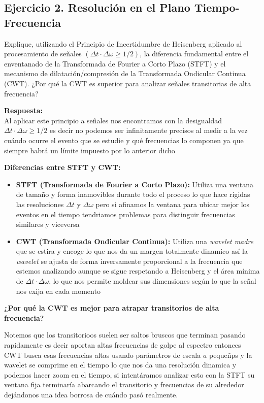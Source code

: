 \subsection*{Ejercicio 2. Resolución en el Plano Tiempo-Frecuencia} %
\noindent Explique, utilizando el Principio de Incertidumbre de Heisenberg aplicado al procesamiento de señales $(\Delta t\cdot\Delta\omega\ge1/2)$, la diferencia fundamental entre el enventanado de la Transformada de Fourier a Corto Plazo (STFT) y el mecanismo de dilatación/compresión de la Transformada Ondicular Continua (CWT). %
¿Por qué la CWT es superior para analizar señales transitorias de alta frecuencia? %

\vspace{0.5cm}
\noindent \textbf{Respuesta:} \\
Al aplicar este principio a señales nos encontramos con la desigualdad $\Delta t \cdot \Delta \omega \ge 1/2$ es decir no podemos ser infinitamente precisos al medir a la vez cuándo ocurre el evento que se estudie y qué frecuencias lo componen ya que siempre habrá un límite impuesto por lo anterior dicho

\textbf{Diferencias entre STFT y CWT:}
\begin{itemize}
    \item \textbf{STFT (Transformada de Fourier a Corto Plazo):} Utiliza una ventana de tamaño y forma inamovibles durante todo el proceso lo que hace rígidas las resoluciones $\Delta t$ y $\Delta \omega$ pero si afinamos la ventana para ubicar mejor los eventos en el tiempo tendriamos problemas para distinguir frecuencias similares y viceversa
    
    \item \textbf{CWT (Transformada Ondicular Continua):} Utiliza una \textit{wavelet madre} que se estira y encoge lo que nos da un margen totalmente dinamico así la \textit{wavelet} se ajusta de forma inversamente proporcional a la frecuencia que estemos analizando aunque se sigue respetando a Heisenberg y el área mínima de $\Delta t \cdot \Delta \omega$, lo que nos permite moldear sus dimensiones según lo que la señal nos exija en cada momento
\end{itemize}

\textbf{¿Por qué la CWT es mejor para atrapar transitorios de alta frecuencia?}

Notemos que los transitorioos suelen ser saltos bruscos que terminan pasando rapidamente es decir aportan altas frecuencias de golpe al espectro entonces CWT busca esas frecuencias altas usando parámetros de escala $a$ pequeñps y la wavelet se comprime en el tiempo lo que nos da una resolución dinamica y podemos hacer zoom en el tiempo, si intentáramos analizar esto con la STFT su ventana fija terminaría abarcando el transitorio y frecuencias de su alrededor dejándonos una idea borrosa de cuándo pasó realmente.\vspace{1cm}
